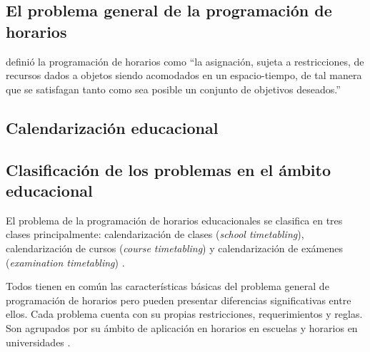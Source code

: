 \documentclass[spanish,draft,12pt,headsepline,footsepline,paper=letter]{scrreprt}
\begin{document}
\subsection{El problema general de la programación de horarios}
\label{problema_general_programacion_horarios}

\citet[p.~53]{wren95scheduling-timetabling} definió la programación de horarios como “la asignación, sujeta a restricciones, de recursos dados a objetos siendo acomodados en un espacio-tiempo, de tal manera que se satisfagan tanto como sea posible un conjunto de objetivos deseados.”

\subsection{Calendarización educacional} %
\label{calendarizacion_educacional}


\subsection{Clasificación de los problemas en el ámbito educacional}
\label{clasificacion_problemas}

El problema de la programación de horarios educacionales se clasifica en tres clases principalmente:
calendarización de clases (\textit{school timetabling}),
calendarización de cursos (\textit{course timetabling}) y
calendarización de exámenes (\textit{examination timetabling}) \citep[p.~88]{schaerf99a-survey-of-automated}.

Todos tienen en común las características básicas del problema general de programación de horarios pero pueden presentar diferencias significativas entre ellos. Cada problema cuenta con su propias restricciones, requerimientos y reglas. Son agrupados por su ámbito de aplicación en horarios en escuelas y horarios en universidades \citep[p.~10]{abdullah06heuristic-approaches}.
\end{document}
